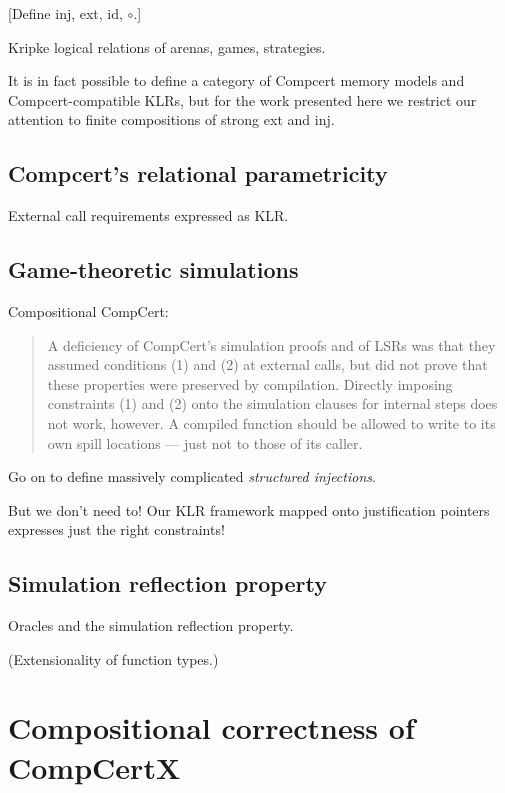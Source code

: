 \documentclass[acmsmall,anonymous,review]{acmart}
\begin{document}
[Define inj, ext, id, $\circ$.]


Kripke logical relations of arenas, games, strategies.

It is in fact possible to define a
category of Compcert memory models and Compcert-compatible KLRs,
but for the work presented here we restrict our attention
to finite compositions of strong \textsf{ext} and \textsf{inj}.


\subsection{Compcert's relational parametricity} %

External call requirements expressed as KLR.


\subsection{Game-theoretic simulations} %

Compositional CompCert:
\begin{quote}
A deficiency of CompCert’s simulation proofs and of LSRs
was that they assumed conditions (1) and (2) at external calls,
but did not prove that these properties were preserved by compilation.
Directly imposing constraints (1) and (2)
onto the simulation clauses for internal steps does not work, however.
A compiled function should be allowed to
write to its own spill locations ---
just not to those of its caller.
\end{quote}
Go on to define massively complicated \emph{structured injections}.

But we don't need to!
Our KLR framework
mapped onto justification pointers
expresses just the right constraints!


\subsection{Simulation reflection property} %

Oracles and the simulation reflection property.

(Extensionality of function types.)



\section{Compositional correctness of CompCertX} %
\end{document}
